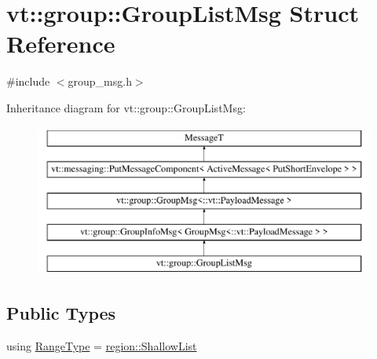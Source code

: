 \hypertarget{structvt_1_1group_1_1_group_list_msg}{}\section{vt\+:\+:group\+:\+:Group\+List\+Msg Struct Reference}
\label{structvt_1_1group_1_1_group_list_msg}


{\ttfamily \#include $<$group\+\_\+msg.\+h$>$}

Inheritance diagram for vt\+:\+:group\+:\+:Group\+List\+Msg\+:\begin{figure}[H]
\begin{center}
\leavevmode
\includegraphics[height=5.000000cm]{structvt_1_1group_1_1_group_list_msg}
\end{center}
\end{figure}
\subsection*{Public Types}
\begin{DoxyCompactItemize}
\item 
using \hyperlink{structvt_1_1group_1_1_group_list_msg_a4b6524168e2e6f3308b1957083fafb45}{Range\+Type} = \hyperlink{structvt_1_1group_1_1region_1_1_shallow_list}{region\+::\+Shallow\+List}
\end{DoxyCompactItemize}

